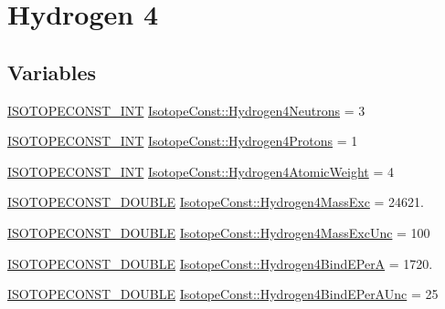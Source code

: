\hypertarget{group___isotope_const-_hydrogen-_h4}{}\section{Hydrogen 4}
\label{group___isotope_const-_hydrogen-_h4}
\subsection*{Variables}
\begin{DoxyCompactItemize}
\item 
\mbox{\hyperlink{group___isotope_const-_macros_ga5f18360b3e99483a35c32d789e62621c}{I\+S\+O\+T\+O\+P\+E\+C\+O\+N\+S\+T\+\_\+\+I\+NT}} \mbox{\hyperlink{group___isotope_const-_hydrogen-_h4_gaecc7a2b2b7b9267319f6b9ff6d30691f}{Isotope\+Const\+::\+Hydrogen4\+Neutrons}} = 3
\item 
\mbox{\hyperlink{group___isotope_const-_macros_ga5f18360b3e99483a35c32d789e62621c}{I\+S\+O\+T\+O\+P\+E\+C\+O\+N\+S\+T\+\_\+\+I\+NT}} \mbox{\hyperlink{group___isotope_const-_hydrogen-_h4_gafcdc6d6881ca92177168b7ef686c3747}{Isotope\+Const\+::\+Hydrogen4\+Protons}} = 1
\item 
\mbox{\hyperlink{group___isotope_const-_macros_ga5f18360b3e99483a35c32d789e62621c}{I\+S\+O\+T\+O\+P\+E\+C\+O\+N\+S\+T\+\_\+\+I\+NT}} \mbox{\hyperlink{group___isotope_const-_hydrogen-_h4_ga92d27018469bc93643e4c153de84386b}{Isotope\+Const\+::\+Hydrogen4\+Atomic\+Weight}} = 4
\item 
\mbox{\hyperlink{group___isotope_const-_macros_ga8f45a7272ce02c0b4c65c44636ed719a}{I\+S\+O\+T\+O\+P\+E\+C\+O\+N\+S\+T\+\_\+\+D\+O\+U\+B\+LE}} \mbox{\hyperlink{group___isotope_const-_hydrogen-_h4_gade00c2354b4755c843c1370c0c438f38}{Isotope\+Const\+::\+Hydrogen4\+Mass\+Exc}} = 24621.
\item 
\mbox{\hyperlink{group___isotope_const-_macros_ga8f45a7272ce02c0b4c65c44636ed719a}{I\+S\+O\+T\+O\+P\+E\+C\+O\+N\+S\+T\+\_\+\+D\+O\+U\+B\+LE}} \mbox{\hyperlink{group___isotope_const-_hydrogen-_h4_ga6739e44f49090dcc44c86c6114b85f6b}{Isotope\+Const\+::\+Hydrogen4\+Mass\+Exc\+Unc}} = 100
\item 
\mbox{\hyperlink{group___isotope_const-_macros_ga8f45a7272ce02c0b4c65c44636ed719a}{I\+S\+O\+T\+O\+P\+E\+C\+O\+N\+S\+T\+\_\+\+D\+O\+U\+B\+LE}} \mbox{\hyperlink{group___isotope_const-_hydrogen-_h4_gac5261fe2e3c7d3ae4306a11f8ad232cc}{Isotope\+Const\+::\+Hydrogen4\+Bind\+E\+PerA}} = 1720.
\item 
\mbox{\hyperlink{group___isotope_const-_macros_ga8f45a7272ce02c0b4c65c44636ed719a}{I\+S\+O\+T\+O\+P\+E\+C\+O\+N\+S\+T\+\_\+\+D\+O\+U\+B\+LE}} \mbox{\hyperlink{group___isotope_const-_hydrogen-_h4_gae868648f486f30d73156bca636635197}{Isotope\+Const\+::\+Hydrogen4\+Bind\+E\+Per\+A\+Unc}} = 25

\end{DoxyCompactItemize}
